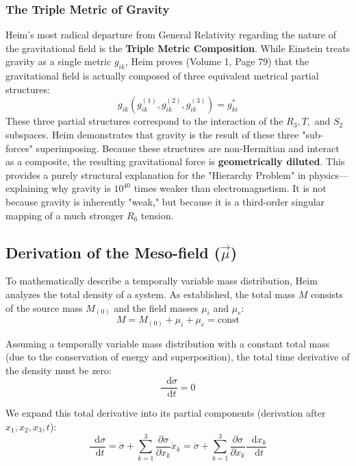 \documentclass[11pt,a4paper,oneside]{article}
\newcommand{\diff}{\mathop{}\!\mathrm{d}} %
\begin{document}
\subsubsection{The Triple Metric of Gravity}
Heim's most radical departure from General Relativity regarding the nature of the gravitational field is the \textbf{Triple Metric Composition}. While Einstein treats gravity as a single metric $g_{ik}$, Heim proves (Volume 1, Page 79) that the gravitational field is actually composed of three equivalent metrical partial structures:
\begin{equation}
    g_{ik}(g_{ik}^{(1)}, g_{ik}^{(2)}, g_{ik}^{(3)}) = g_{ki}^*
\end{equation}
These three partial structures correspond to the interaction of the $R_3, T,$ and $S_2$ subspaces. Heim demonstrates that gravity is the result of these three "sub-forces" superimposing. Because these structures are non-Hermitian and interact as a composite, the resulting gravitational force is \textbf{geometrically diluted}. This provides a purely structural explanation for the "Hierarchy Problem" in physics—explaining why gravity is $10^{40}$ times weaker than electromagnetism. It is not because gravity is inherently "weak," but because it is a third-order singular mapping of a much stronger $R_6$ tension.

\subsection{Derivation of the Meso-field (\texorpdfstring{$\vec{\mu}$}{mu})}

To mathematically describe a temporally variable mass distribution, Heim analyzes the total density of a system. As established, the total mass $M$ consists of the source mass $M_{(0)}$ and the field masses $\mu_i$ and $\mu_e$:
\begin{equation}
    M = M_{(0)} + \mu_i + \mu_e = \text{const}
\end{equation}

Assuming a temporally variable mass distribution with a constant total mass (due to the conservation of energy and superposition), the total time derivative of the density must be zero:
\begin{equation}
    \frac{\diff\sigma}{\diff t} = 0
\end{equation}

We expand this total derivative into its partial components (derivation after $x_1, x_2, x_3, t$):
\begin{equation}
    \frac{\diff\sigma}{\diff t} = \dot{\sigma} + \sum_{k=1}^3 \frac{\partial \sigma}{\partial x_k} \dot{x}_k = \dot{\sigma} + \sum_{k=1}^3 \frac{\partial \sigma}{\partial x_k} \frac{\diff x_k}{\diff t}
\end{equation}
\end{document}
